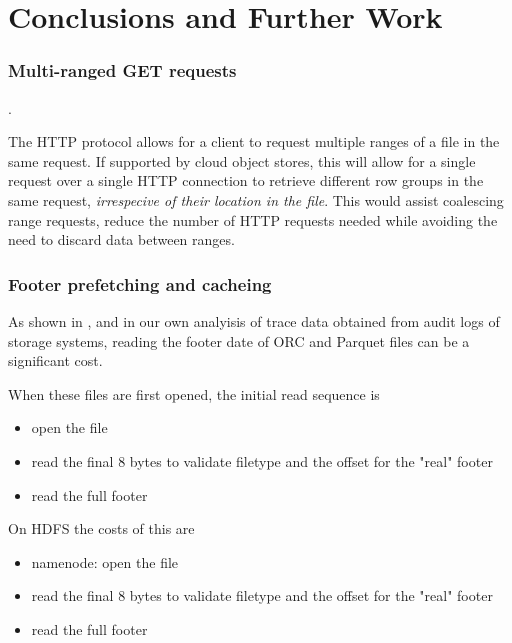 \documentclass[conference]{IEEEtran}
\begin{document}
\section{Conclusions and Further Work}
\label{sec:conclusions}

\subsubsection{Multi-ranged GET requests}.

The HTTP protocol allows for a client to request multiple ranges of a file
in the same request.
If supported by cloud object stores, this will allow for a single request
over a single HTTP connection to retrieve different row groups in the same
request, \emph{irrespecive of their location in the file}.
This would assist coalescing range requests, reduce the number of HTTP requests
needed while avoiding the need to discard data between ranges.

\subsubsection{Footer prefetching and cacheing}

As shown in \cite{zeng2023empirical}, and in our own analyisis of trace data
obtained from audit logs of storage systems, reading the footer date of ORC and Parquet
files can be a significant cost.

When these files are first opened, the initial read sequence is

\begin{itemize}
  \item{open the file}
  \item{read the final 8 bytes to validate filetype and the offset for the "real" footer}
  \item{read the full footer}
\end{itemize}

On HDFS the costs of this are
\begin{itemize}
  \item{namenode: open the file}
  \item{read the final 8 bytes to validate filetype and the offset for the "real" footer}
  \item{read the full footer}
\end{itemize}






\end{document}
